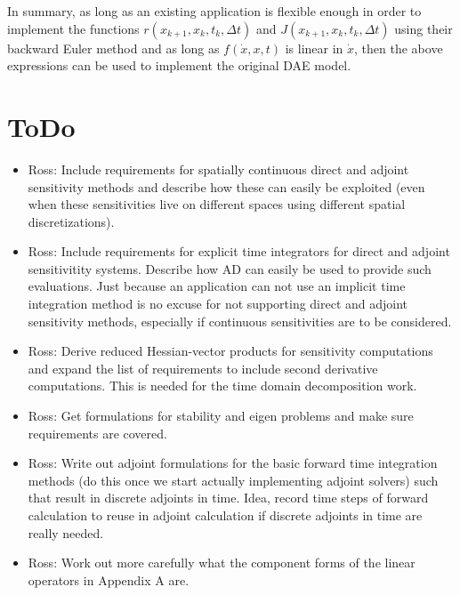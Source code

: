 \documentclass[pdf,ps2pdf,11pt]{SANDreport}
\begin{document}
In summary, as long as an existing application is flexible enough in order to
implement the functions $r(x_{k+1},x_k,t_k,\Delta t)$ and
$J(x_{k+1},x_k,t_k,\Delta t)$ using their backward Euler method
and as long as $f(\dot{x},x,t)$ is linear in $\dot{x}$, then the above
expressions can be used to implement the original DAE model.

\section{ToDo}

\begin{itemize}
%
{}\item Ross: Include requirements for spatially continuous direct and adjoint
sensitivity methods and describe how these can easily be exploited (even when
these sensitivities live on different spaces using different spatial
discretizations).
%
{}\item Ross: Include requirements for explicit time integrators for direct
and adjoint sensitivitity systems.  Describe how AD can easily be used to
provide such evaluations.  Just because an application can not use an implicit
time integration method is no excuse for not supporting direct and adjoint
sensitivity methods, especially if continuous sensitivities are to be
considered.
%
{}\item Ross: Derive reduced Hessian-vector products for sensitivity
computations and expand the list of requirements to include second derivative
computations.  This is needed for the time domain decomposition work.
%
{}\item Ross: Get formulations for stability and eigen problems and make sure
requirements are covered.
%
{}\item Ross: Write out adjoint formulations for the basic forward
time integration methods (do this once we start actually implementing
adjoint solvers) such that result in discrete adjoints in time.  Idea,
record time steps of forward calculation to reuse in adjoint
calculation if discrete adjoints in time are really needed.
%
{}\item Ross: Work out more carefully what the component forms of the
linear operators in Appendix A are.
%

\end{itemize}
\end{document}
